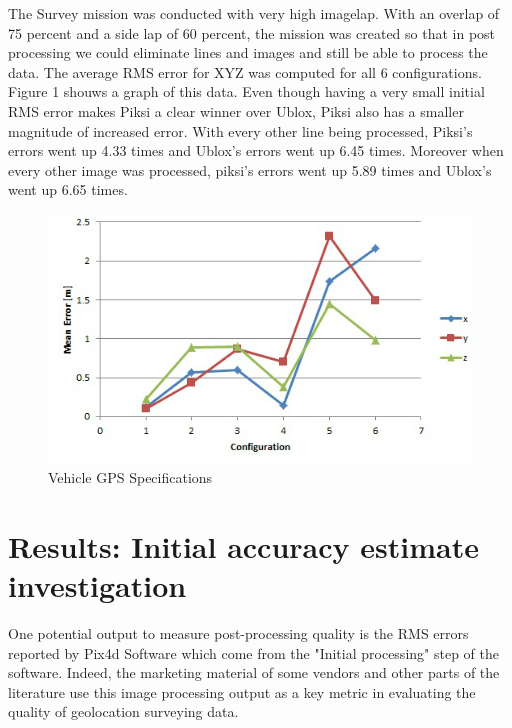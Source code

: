 \documentclass{article}
\begin{document}
The Survey mission was conducted with very high imagelap. With an overlap of 75 percent and a side lap of 60 percent, the mission was created so that in post processing we could eliminate lines and images and still be able to process the data. The average RMS error for XYZ was computed for all 6 configurations. Figure 1 shouws a graph of this data. Even though having a very small initial RMS error makes Piksi a clear winner over Ublox, Piksi also has a smaller magnitude of increased error. With every other line being processed, Piksi's errors went up 4.33 times and Ublox's errors went up 6.45 times. Moreover when every other image was processed, piksi's errors went up 5.89 times and Ublox's went up 6.65 times.
\begin{figure}
\begin{center}
\includegraphics[width=5.5in]{images/rms_error_graph.jpg}
\end{center}
\label{table:gps}
\caption{Vehicle GPS Specifications}
\end{figure}

\section{Results: Initial accuracy estimate investigation}
One potential output to measure post-processing quality is the RMS errors reported by Pix4d Software which come from the "Initial processing" step of the software.  Indeed, the marketing material of some vendors and other parts of the literature use this image processing output as a key metric in evaluating the quality of geolocation surveying data.
\end{document}
